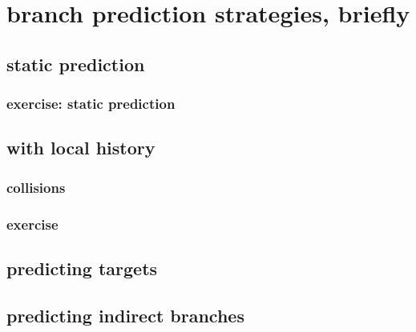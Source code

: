 \section{branch prediction strategies, briefly}

\subsection{static prediction}


\subsubsection{exercise: static prediction}


\subsection{with local history}


\subsubsection{collisions}


%

\subsubsection{exercise}


\subsection{predicting targets}


\subsection{predicting indirect branches}

